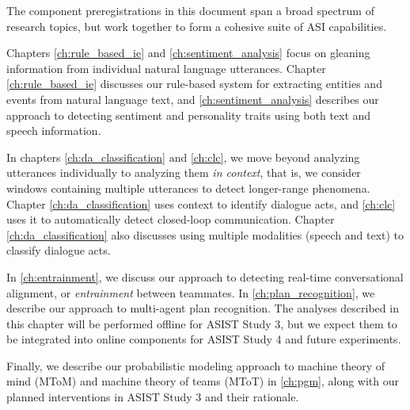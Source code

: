 
The component preregistrations in this document span a broad spectrum of
research topics, but work together to form a cohesive suite of ASI
capabilities.

Chapters \ref{ch:rule_based_ie} and \ref{ch:sentiment_analysis} focus on
gleaning information from individual natural language utterances. Chapter
\ref{ch:rule_based_ie} discusses our rule-based system for extracting entities
and events from natural language text, and \autoref{ch:sentiment_analysis}
describes our approach to detecting sentiment and personality traits using both
text and speech information.

In chapters \ref{ch:da_classification} and \ref{ch:clc}, we move
beyond analyzing utterances individually to analyzing them \emph{in context},
that is, we consider windows containing multiple utterances to detect
longer-range phenomena. Chapter \ref{ch:da_classification} uses context to identify
dialogue acts, and \autoref{ch:clc} uses it to automatically detect
closed-loop communication. Chapter \ref{ch:da_classification} also discusses
using multiple modalities (speech and text) to classify dialogue acts.

In \autoref{ch:entrainment}, we discuss our approach to detecting real-time
conversational alignment, or \emph{entrainment} between teammates. In
\autoref{ch:plan_recognition}, we describe our approach to multi-agent plan
recognition. The analyses described in this chapter will be performed offline
for ASIST Study 3, but we expect them to be integrated into online components
for ASIST Study 4 and future experiments.

Finally, we describe our probabilistic modeling approach to machine theory of
mind (MToM) and machine theory of teams (MToT) in \autoref{ch:pgm}, along with
our planned interventions in ASIST Study 3 and their rationale.
